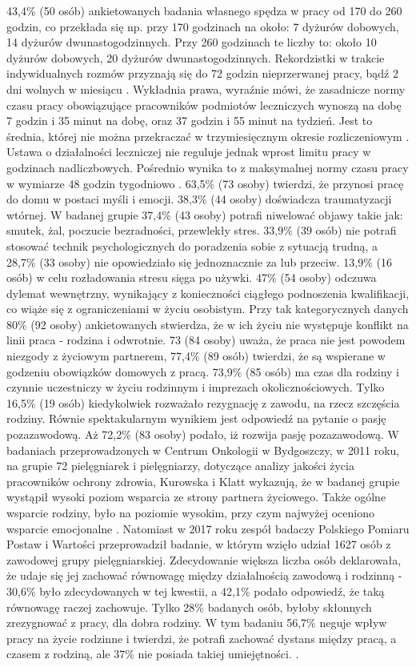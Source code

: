 \documentclass[a4paper,12pt,twoside,openright]{mwrep}
\begin{document}
 43,4\%  (50 osób) ankietowanych badania własnego spędza w pracy od 170 do 260 godzin, co przekłada się np. przy 170 godzinach na około:  7 dyżurów dobowych, 14 dyżurów dwunastogodzinnych. Przy 260 godzinach te liczby to: około  10 dyżurów dobowych,  20 dyżurów dwunastogodzinnych. Rekordzistki w trakcie indywidualnych rozmów przyznają się do 72 godzin nieprzerwanej pracy, bądź 2 dni wolnych w miesiącu \cite{cyfrowe}.  Wykładnia prawa, wyraźnie mówi, że zasadnicze normy czasu pracy obowiązujące pracowników podmiotów leczniczych wynoszą na dobę 7 godzin i 35 minut na dobę, oraz 37 godzin i 55 minut na tydzień. Jest to średnia, której nie można przekraczać w trzymiesięcznym okresie rozliczeniowym \cite{okres}. Ustawa o działalności leczniczej nie reguluje  jednak wprost limitu pracy w godzinach nadliczbowych. Pośrednio wynika to z maksymalnej normy czasu pracy w wymiarze 48 godzin tygodniowo \cite{klauzula}.
  63,5\%  (73 osoby) twierdzi, że przynosi pracę do domu w postaci myśli i emocji. 38,3\% (44 osoby) doświadcza traumatyzacji wtórnej. W badanej grupie 37,4\%  (43 osoby) potrafi niwelować objawy takie jak: smutek, żal, poczucie bezradności, przewlekły stres. 33,9\%  (39 osób) nie potrafi stosować technik psychologicznych do poradzenia sobie z sytuacją trudną, a 28,7\%  (33 osoby) nie opowiedziało się jednoznacznie za lub przeciw. 13,9\% (16 osób) w celu rozładowania stresu sięga po używki. 47\% (54 osoby) odczuwa dylemat wewnętrzny, wynikający z konieczności ciągłego podnoszenia kwalifikacji, co wiąże się z ograniczeniami w życiu osobistym. Przy tak kategorycznych danych 80\% (92 osoby) ankietowanych stwierdza, że w ich życiu nie występuje konflikt na linii praca - rodzina i odwrotnie. 73 (84 osoby) uważa, że praca nie jest powodem niezgody z życiowym partnerem, 77,4\%  (89 osób) twierdzi, że są wspierane w godzeniu obowiązków domowych z pracą. 73,9\% (85 osób) ma czas dla rodziny i czynnie uczestniczy w życiu rodzinnym i imprezach okolicznościowych. Tylko 16,5\% (19 osób) kiedykolwiek rozważało rezygnację z zawodu, na rzecz szczęścia rodziny. Równie spektakularnym wynikiem jest odpowiedź na pytanie o pasję pozazawodową. Aż 72,2\% (83 osoby) podało, iż rozwija pasję pozazawodową.  W badaniach  przeprowadzonych w Centrum Onkologii w Bydgoszczy, w 2011 roku, na grupie 72 pielęgniarek i pielęgniarzy, dotyczące analizy jakości życia pracowników ochrony zdrowia, Kurowska i Klatt  wykazują, że w badanej grupie wystąpił wysoki poziom wsparcia ze strony partnera życiowego. Także ogólne wsparcie rodziny, było na poziomie wysokim, przy czym najwyżej oceniono wsparcie emocjonalne \cite{poziom}. Natomiast w 2017 roku zespół badaczy Polskiego Pomiaru Postaw i Wartości przeprowadził badanie, w którym wzięło udział 1627 osób z zawodowej grupy pielęgniarskiej. Zdecydowanie większa liczba osób deklarowała, że udaje się jej zachować równowagę między działalnością zawodową i rodzinną - 30,6\% było zdecydowanych w tej kwestii, a 42,1\% podało odpowiedź, że taką równowagę raczej zachowuje. Tylko 28\% badanych osób, byłoby skłonnych zrezygnować z pracy, dla dobra rodziny. W tym badaniu  56,7\% neguje wpływ pracy na życie rodzinne i twierdzi, że potrafi zachować dystans między pracą, a czasem z rodziną, ale 37\% nie posiada takiej umiejętności. \cite{komunikat}.
\end{document}
